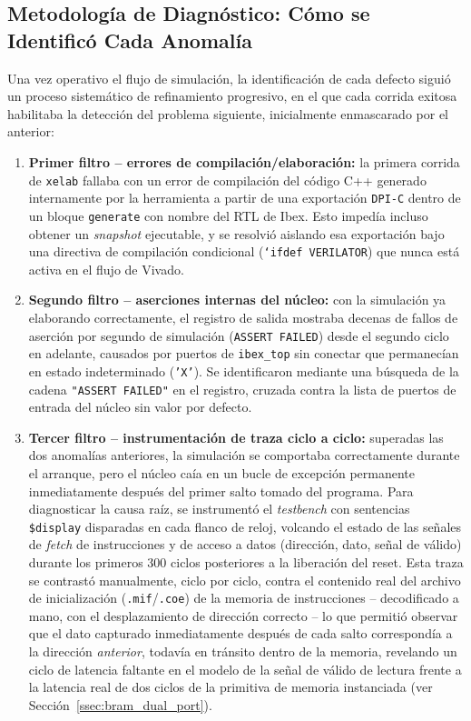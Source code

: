 \subsection{Metodología de Diagnóstico: Cómo se Identificó Cada Anomalía}
\label{ssec:metodologia_diagnostico}

Una vez operativo el flujo de simulación, la identificación de cada
defecto siguió un proceso sistemático de refinamiento progresivo, en el
que cada corrida exitosa habilitaba la detección del problema siguiente,
inicialmente enmascarado por el anterior:

\begin{enumerate}
    \item \textbf{Primer filtro -- errores de compilación/elaboración:} la
    primera corrida de \texttt{xelab} fallaba con un error de compilación
    del código C++ generado internamente por la herramienta a partir de
    una exportación \texttt{DPI-C} dentro de un bloque \texttt{generate}
    con nombre del RTL de Ibex. Esto impedía incluso obtener un
    \textit{snapshot} ejecutable, y se resolvió aislando esa exportación
    bajo una directiva de compilación condicional (\texttt{`ifdef
    VERILATOR}) que nunca está activa en el flujo de Vivado.

    \item \textbf{Segundo filtro -- aserciones internas del núcleo:} con la
    simulación ya elaborando correctamente, el registro de salida mostraba
    decenas de fallos de aserción por segundo de simulación
    (\texttt{ASSERT FAILED}) desde el segundo ciclo en adelante, causados
    por puertos de \texttt{ibex\_top} sin conectar que permanecían en
    estado indeterminado (\texttt{'X'}). Se identificaron mediante una
    búsqueda de la cadena \texttt{"ASSERT FAILED"} en el registro,
    cruzada contra la lista de puertos de entrada del núcleo sin valor por
    defecto.

    \item \textbf{Tercer filtro -- instrumentación de traza ciclo a
    ciclo:} superadas las dos anomalías anteriores, la simulación se
    comportaba correctamente durante el arranque, pero el núcleo caía en
    un bucle de excepción permanente inmediatamente después del primer
    salto tomado del programa. Para diagnosticar la causa raíz, se
    instrumentó el \textit{testbench} con sentencias \texttt{\$display}
    disparadas en cada flanco de reloj, volcando el estado de las señales
    de \textit{fetch} de instrucciones y de acceso a datos (dirección,
    dato, señal de válido) durante los primeros $300$ ciclos posteriores a
    la liberación del reset. Esta traza se contrastó manualmente, ciclo
    por ciclo, contra el contenido real del archivo de inicialización
    (\texttt{.mif}/\texttt{.coe}) de la memoria de instrucciones --
    decodificado a mano, con el desplazamiento de dirección correcto --
    lo que permitió observar que el dato capturado inmediatamente después
    de cada salto correspondía a la dirección \textit{anterior}, todavía
    en tránsito dentro de la memoria, revelando un ciclo de latencia
    faltante en el modelo de la señal de válido de lectura frente a la
    latencia real de dos ciclos de la primitiva de memoria instanciada
    (ver Sección~\ref{ssec:bram_dual_port}).


\end{enumerate}
